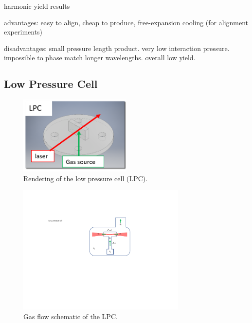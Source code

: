 harmonic yield results

advantages: easy to align, cheap to produce, free-expansion cooling (for alignment experiments)

disadvantages: small pressure length product. very low interaction pressure. impossible to phase match longer wavelengths. overall low yield. 

\subsection{Low Pressure Cell}

\begin{figure}
	\centering
	\includegraphics[width=0.5\textwidth]{figures/chap3/LPC_diagram.png}
	\caption{Rendering of the low pressure cell (LPC).}
	\label{fig:LPC_diagram}
\end{figure}

\begin{figure}
	\centering
	\includegraphics[width=0.75\textwidth]{figures/chap3/LPC_schematic.pdf}
	\caption{Gas flow schematic of the LPC.}
	\label{fig:LPC_schematic}
\end{figure}

